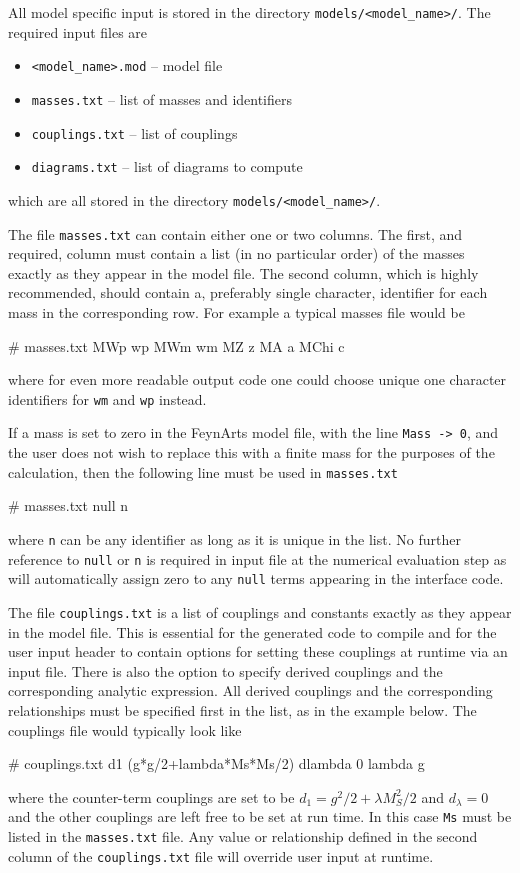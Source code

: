 All model specific input is stored in the directory \lstinline{models/<model_name>/}.  The required input files are
\begin{itemize}
\item \lstinline{<model_name>.mod}  -- \feynarts model file
\item \lstinline{masses.txt} -- list of masses and identifiers
\item \lstinline{couplings.txt} -- list of couplings
\item \lstinline{diagrams.txt} -- list of diagrams to compute
\end{itemize}
which are all stored in the directory \lstinline{models/<model_name>/}.

The file \lstinline{masses.txt} can contain either one or two columns.  The first, and required, column must contain a list (in no particular order) of the masses exactly as they appear in the \feynarts model file.  The second column, which is highly recommended, should contain a, preferably single character, identifier for each mass in the corresponding row.  For example a typical masses file would be
\begin{lstterm}
# masses.txt
MWp          wp
MWm          wm
MZ           z
MA           a
MChi	       c
\end{lstterm}
where for even more readable output code one could choose unique one character identifiers for \lstinline{wm} and \lstinline{wp} instead.

If a mass is set to zero in the FeynArts model file, with the line \lstinline{Mass -> 0}, and the user does not wish to replace this with a finite mass for the purposes of the calculation, then the following line must be used in \lstinline{masses.txt}
\begin{lstterm}
# masses.txt
null n
\end{lstterm}
where \lstinline{n} can be any identifier as long as it is unique in the list.  No further reference to \lstinline{null} or \lstinline{n} is required in input file at the numerical evaluation step as \mb will automatically assign zero to any \lstinline{null} terms appearing in the \tsil interface code.


The file \lstinline{couplings.txt} is a list of couplings and constants exactly as they appear in the \feynarts model file.  This is essential for the generated code to compile and for the user input header to contain options for setting these couplings at runtime via an input file.  There is also the option to specify derived couplings and the corresponding analytic expression.  All derived couplings and the corresponding relationships must be specified first in the list, as in the example below.  The couplings file would typically look like
\begin{lstterm}
# couplings.txt
d1 (g*g/2+lambda*Ms*Ms/2)
dlambda 0
lambda
g
\end{lstterm}
where the counter-term couplings are set to be $d_1=g^2/2 + \lambda M_S^2/2$ and $d_{\lambda}=0$ and the other couplings are left free to be set at run time.  In this case \lstinline{Ms} must be listed in the \lstinline{masses.txt} file.  Any value or relationship defined in the second column of the \lstinline{couplings.txt} file will override user input at runtime.

